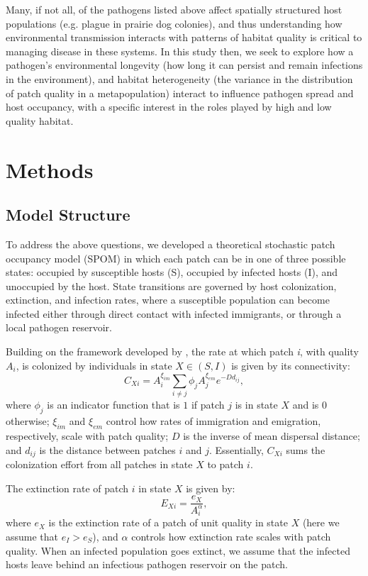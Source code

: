 \documentclass{svjour3}
\begin{document}
Many, if not all, of the pathogens listed above affect spatially structured host populations (e.g. plague in prairie dog colonies), and thus understanding how environmental transmission interacts with patterns of habitat quality is critical to managing disease in these systems.  In this study then, we seek to explore how a pathogen's environmental longevity (how long it can persist and remain infections in the environment), and habitat heterogeneity (the variance in the distribution of patch quality in a metapopulation) interact to influence pathogen spread and host occupancy, with a specific interest in the roles played by high and low quality habitat.  

\section{Methods}
\label{methods}

\subsection{Model Structure}
To address the above questions, we developed a theoretical stochastic patch occupancy model (SPOM) in which each patch can be in one of three possible states: occupied by susceptible hosts (S), occupied by infected hosts (I), and unoccupied by the host.  State transitions are governed by host colonization, extinction, and infection rates, where a susceptible population can become infected either through direct contact with infected immigrants, or through a local pathogen reservoir.  

Building on the framework developed by \cite{Hanski1994}, the rate at which patch \emph{i}, with quality $A_i$, is colonized by individuals in state $X \in (S,I)$ is given by its connectivity:
\begin{equation}
C_{Xi}=A_i^{\xi_{im}} \sum_{i\neq j }\phi_jA_j^{\xi_{em}}e^{-D d_{ij}},
\end{equation}
where $\phi_j$ is an indicator function that is $1$ if patch $j$ is in state $X$ and is $0$ otherwise; $\xi_{im}$ and $\xi_{em}$ control how rates of immigration and emigration, respectively, scale with patch quality; $D$ is the inverse of mean dispersal distance; and $d_{ij}$ is the distance between patches $i$ and $j$.  Essentially, $C_{Xi}$ sums the colonization effort from all patches in state $X$ to patch $i$.  

The extinction rate of patch $i$ in state $X$ is given by:
\begin{equation}
E_{Xi}=\frac{e_X}{A_i^\alpha},
\end{equation}
where $e_X$ is the extinction rate of a patch of unit quality in state $X$ (here we assume that $e_I>e_S$), and $\alpha$ controls how extinction rate scales with patch quality.  When an infected population goes extinct, we assume that the infected hosts leave behind an infectious pathogen reservoir on the patch.  
\end{document}
